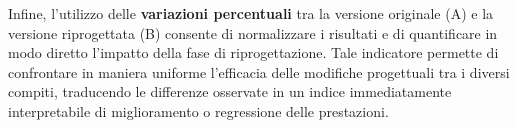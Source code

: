Infine, l’utilizzo delle \textbf{variazioni percentuali} tra la versione originale (A) e la versione riprogettata (B) consente di normalizzare i risultati e di quantificare in modo diretto l’impatto della fase di riprogettazione. Tale indicatore permette di confrontare in maniera uniforme l’efficacia delle modifiche progettuali tra i diversi compiti, traducendo le differenze osservate in un indice immediatamente interpretabile di miglioramento o regressione delle prestazioni.
















